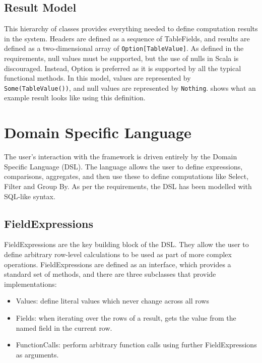 
\subsection{Result Model}
This hierarchy of classes provides everything needed to define computation results in the system. Headers are defined as a sequence of TableFields, and results are defined as a two-dimensional array of \texttt{Option[TableValue]}. As defined in the requirements, null values must be supported, but the use of nulls in Scala is discouraged. Instead, Option is preferred as it is supported by all the typical functional methods. In this model, values are represented by \texttt{Some(TableValue())}, and null values are represented by \texttt{Nothing}.  shows what an example result looks like using this definition.


\section{Domain Specific Language}
The user's interaction with the framework is driven entirely by the Domain Specific Language (DSL). The language allows the user to define expressions, comparisons, aggregates, and then use these to define computations like Select, Filter and Group By. As per the requirements, the DSL has been modelled with SQL-like syntax.

\subsection{FieldExpressions}
FieldExpressions are the key building block of the DSL. They allow the user to define arbitrary row-level calculations to be used as part of more complex operations. FieldExpressions are defined as an interface, which provides a standard set of methods, and there are three subclasses that provide implementations:

\begin{itemize}
	\item Values: define literal values which never change across all rows
	\item Fields: when iterating over the rows of a result, gets the value from the named field in the current row.
	\item FunctionCalls: perform arbitrary function calls using further FieldExpressions as arguments.
\end{itemize}

